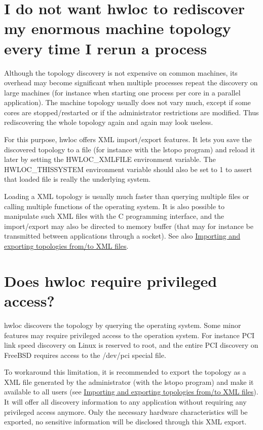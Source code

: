 \hypertarget{a00011_faq_xml}{}\section{I do not want hwloc to rediscover my enormous machine topology every time I rerun a process}\label{a00011_faq_xml}
Although the topology discovery is not expensive on common machines, its overhead may become significant when multiple processes repeat the discovery on large machines (for instance when starting one process per core in a parallel application). The machine topology usually does not vary much, except if some cores are stopped/restarted or if the administrator restrictions are modified. Thus rediscovering the whole topology again and again may look useless.

For this purpose, hwloc offers XML import/export features. It lets you save the discovered topology to a file (for instance with the lstopo program) and reload it later by setting the HWLOC\_\-XMLFILE environment variable. The HWLOC\_\-THISSYSTEM environment variable should also be set to 1 to assert that loaded file is really the underlying system.

Loading a XML topology is usually much faster than querying multiple files or calling multiple functions of the operating system. It is also possible to manipulate such XML files with the C programming interface, and the import/export may also be directed to memory buffer (that may for instance be transmitted between applications through a socket). See also \hyperlink{a00007}{Importing and exporting topologies from/to XML files}.\hypertarget{a00011_faq_privileged}{}\section{Does hwloc require privileged access?}\label{a00011_faq_privileged}
hwloc discovers the topology by querying the operating system. Some minor features may require privileged access to the operation system. For instance PCI link speed discovery on Linux is reserved to root, and the entire PCI discovery on FreeBSD requires access to the /dev/pci special file.

To workaround this limitation, it is recommended to export the topology as a XML file generated by the administrator (with the lstopo program) and make it available to all users (see \hyperlink{a00007}{Importing and exporting topologies from/to XML files}). It will offer all discovery information to any application without requiring any privileged access anymore. Only the necessary hardware characteristics will be exported, no sensitive information will be disclosed through this XML export.

